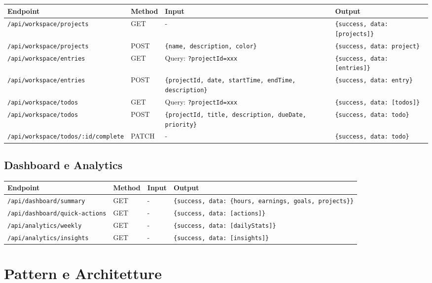 \documentclass[11pt,a4paper]{article}
\begin{document}
\begin{longtable}{|p{3cm}|p{2cm}|p{4cm}|p{6cm}|}
\hline
\textbf{Endpoint} & \textbf{Method} & \textbf{Input} & \textbf{Output} \\
\hline
\endhead
\hline
\endfoot
\hline
\endlastfoot
\texttt{/api/workspace/projects} & GET & - & \texttt{\{success, data: [projects]\}} \\
\texttt{/api/workspace/projects} & POST & \texttt{\{name, description, color\}} & \texttt{\{success, data: project\}} \\
\texttt{/api/workspace/entries} & GET & Query: \texttt{?projectId=xxx} & \texttt{\{success, data: [entries]\}} \\
\texttt{/api/workspace/entries} & POST & \texttt{\{projectId, date, startTime, endTime, description\}} & \texttt{\{success, data: entry\}} \\
\texttt{/api/workspace/todos} & GET & Query: \texttt{?projectId=xxx} & \texttt{\{success, data: [todos]\}} \\
\texttt{/api/workspace/todos} & POST & \texttt{\{projectId, title, description, dueDate, priority\}} & \texttt{\{success, data: todo\}} \\
\texttt{/api/workspace/todos/:id/complete} & PATCH & - & \texttt{\{success, data: todo\}} \\
\hline
\end{longtable}

\subsection{Dashboard e Analytics}

\begin{longtable}{|p{3cm}|p{2cm}|p{4cm}|p{6cm}|}
\hline
\textbf{Endpoint} & \textbf{Method} & \textbf{Input} & \textbf{Output} \\
\hline
\endhead
\hline
\endfoot
\hline
\endlastfoot
\texttt{/api/dashboard/summary} & GET & - & \texttt{\{success, data: \{hours, earnings, goals, projects\}\}} \\
\texttt{/api/dashboard/quick-actions} & GET & - & \texttt{\{success, data: [actions]\}} \\
\texttt{/api/analytics/weekly} & GET & - & \texttt{\{success, data: [dailyStats]\}} \\
\texttt{/api/analytics/insights} & GET & - & \texttt{\{success, data: [insights]\}} \\
\hline
\end{longtable}

\section{Pattern e Architetture}
\end{document}
